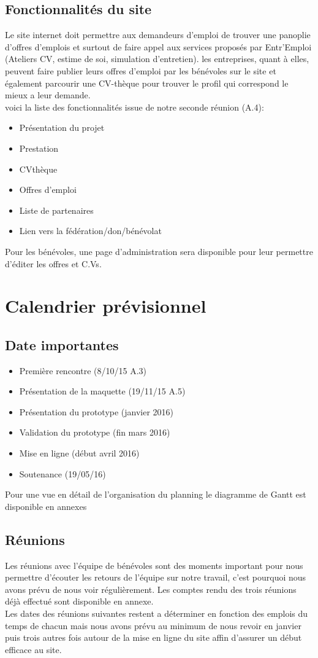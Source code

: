 \documentclass[a4paper, 12pt]{report}
\begin{document}
\section{Fonctionnalités du site}
Le site internet doit permettre aux demandeurs d'emploi de trouver une panoplie d'offres d'emplois et surtout de faire
appel aux services proposés par Entr'Emploi (Ateliers CV, estime de soi, simulation d'entretien).
les entreprises, quant à elles, peuvent faire publier leurs offres d'emploi par les bénévoles sur le site et également
parcourir une CV-thèque pour trouver le profil qui correspond le mieux a leur demande.\\
voici la liste des fonctionnalités issue de notre seconde réunion (A.4):
\begin{itemize}
    \item Présentation du projet
    \item Prestation
    \item CVthèque
    \item Offres d'emploi
    \item Liste de partenaires
    \item Lien vers la fédération/don/bénévolat
\end{itemize}
Pour les bénévoles, une page d'administration sera disponible pour leur permettre d'éditer les offres et C.Vs.

\chapter{Calendrier prévisionnel}
\thispagestyle{fancy}
\section{Date importantes}
\begin{itemize}
\item Première rencontre (8/10/15 A.3)
\item Présentation de la maquette (19/11/15 A.5)
\item Présentation du prototype (janvier 2016)
\item Validation du prototype (fin mars 2016)
\item Mise en ligne (début avril 2016)
\item Soutenance (19/05/16)
\end{itemize}
Pour une vue en détail de l'organisation du planning le diagramme de Gantt est disponible en annexes
\section{Réunions}
Les réunions avec l'équipe de bénévoles sont des moments important pour nous permettre d'écouter les retours de l'équipe sur notre travail, c'est pourquoi nous avons prévu de nous voir régulièrement. Les comptes rendu des trois réunions déjà effectué sont disponible en annexe.\\ Les dates des réunions suivantes restent a déterminer en fonction des emplois du temps de chacun mais nous avons prévu au minimum de nous revoir en janvier puis trois autres fois autour de la mise en ligne du site affin d'assurer un début efficace au site.
\end{document}

